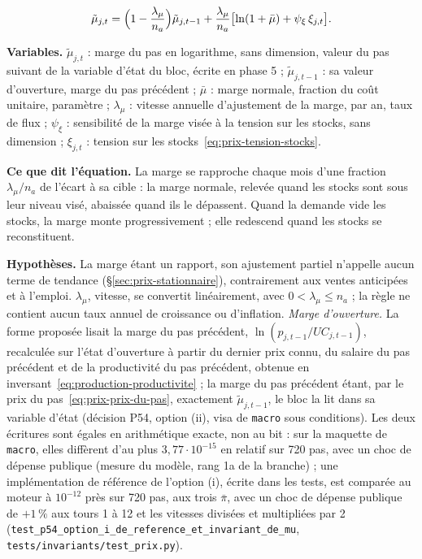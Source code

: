 \documentclass[11pt,a4paper]{article}
\newcommand{\variables}{\par\noindent\textbf{Variables.} }
\newcommand{\sens}{\par\noindent\textbf{Ce que dit l'équation.} }
\newcommand{\hyp}{\par\noindent\textbf{Hypothèses.} }
\begin{document}
\begin{equation}\label{eq:prix-marge}
\tilde\mu_{j,t} = \Bigl(1 - \frac{\lambda_\mu}{n_a}\Bigr) \tilde\mu_{j,t-1} + \frac{\lambda_\mu}{n_a}\bigl[\ln(1 + \bar\mu) + \psi_\xi\,\xi_{j,t}\bigr] .
\end{equation}
\begin{lecture}[marge]
\variables $\tilde\mu_{j,t}$ : marge du pas en logarithme, sans dimension, valeur du pas suivant de la variable d'état du bloc, écrite en phase 5 ; $\tilde\mu_{j,t-1}$ : sa valeur d'ouverture, marge du pas précédent ; $\bar\mu$ : marge normale, fraction du coût unitaire, paramètre ; $\lambda_\mu$ : vitesse annuelle d'ajustement de la marge, par an, taux de flux ; $\psi_\xi$ : sensibilité de la marge visée à la tension sur les stocks, sans dimension ; $\xi_{j,t}$ : tension sur les stocks~\eqref{eq:prix-tension-stocks}.
\sens La marge se rapproche chaque mois d'une fraction $\lambda_\mu/n_a$ de l'écart à sa cible : la marge normale, relevée quand les stocks sont sous leur niveau visé, abaissée quand ils le dépassent. Quand la demande vide les stocks, la marge monte progressivement ; elle redescend quand les stocks se reconstituent.
\hyp La marge étant un rapport, son ajustement partiel n'appelle aucun terme de tendance (\S\ref{sec:prix-stationnaire}), contrairement aux ventes anticipées et à l'emploi. $\lambda_\mu$, vitesse, se convertit linéairement, avec $0 < \lambda_\mu \le n_a$ ; la règle ne contient aucun taux annuel de croissance ou d'inflation. \emph{Marge d'ouverture.} La forme proposée lisait la marge du pas précédent, $\ln(p_{j,t-1}/\mathit{UC}_{j,t-1})$, recalculée sur l'état d'ouverture à partir du dernier prix connu, du salaire du pas précédent et de la productivité du pas précédent, obtenue en inversant~\eqref{eq:production-productivite} ; la marge du pas précédent étant, par le prix du pas~\eqref{eq:prix-prix-du-pas}, exactement $\tilde\mu_{j,t-1}$, le bloc la lit dans sa variable d'état (décision P54, option (ii), visa de \texttt{macro} sous conditions). Les deux écritures sont égales en arithmétique exacte, non au bit : sur la maquette de \texttt{macro}, elles diffèrent d'au plus $3{,}77 \cdot 10^{-15}$ en relatif sur 720 pas, avec un choc de dépense publique (mesure du modèle, rang 1a de la branche) ; une implémentation de référence de l'option (i), écrite dans les tests, est comparée au moteur à $10^{-12}$ près sur 720 pas, aux trois $\bar\pi$, avec un choc de dépense publique de $+1\,\%$ aux tours 1 à 12 et les vitesses divisées et multipliées par 2 (\nolinkurl{test_p54_option_i_de_reference_et_invariant_de_mu}, \nolinkurl{tests/invariants/test_prix.py}).

\end{lecture}
\end{document}
